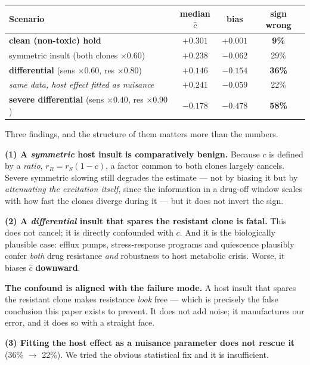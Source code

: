 \documentclass[11pt,a4paper]{article}
\newcommand{\chat}{\hat{c}}
\begin{document}
\begin{center}
\small
\begin{tabular}{lccc}
\toprule
\textbf{Scenario} & \textbf{median $\chat$} & \textbf{bias} & \textbf{sign wrong}\\
\midrule
\textbf{clean (non-toxic) hold} & $+0.301$ & $+0.001$ & \textbf{9\%}\\
symmetric insult (both clones $\times 0.60$) & $+0.238$ & $-0.062$ & 29\%\\
\textbf{differential} (sens $\times0.60$, res $\times0.80$) & $+0.146$ & $-0.154$ & \textbf{36\%}\\
\quad \emph{same data, host effect fitted as nuisance} & $+0.241$ & $-0.059$ & 22\%\\
\textbf{severe differential} (sens $\times0.40$, res $\times0.90$) & $\mathbf{-0.178}$ & $\mathbf{-0.478}$ & \textbf{58\%}\\
\bottomrule
\end{tabular}
\end{center}

Three findings, and the structure of them matters more than the numbers.

\textbf{(1) A \emph{symmetric} host insult is comparatively benign.} Because $c$ is
defined by a \emph{ratio}, $r_R = r_S(1-c)$, a factor common to both clones largely
cancels. Severe symmetric slowing still degrades the estimate --- not by biasing it
but by \emph{attenuating the excitation itself}, since the information in a drug-off
window scales with how fast the clones diverge during it --- but it does not invert
the sign.

\textbf{(2) A \emph{differential} insult that spares the resistant clone is fatal.}
This does not cancel; it is directly confounded with $c$. And it is the biologically
plausible case: efflux pumps, stress-response programs and quiescence plausibly
confer \emph{both} drug resistance \emph{and} robustness to host metabolic crisis.
Worse, it biases $\chat$ \textbf{downward}.

\begin{tcolorbox}[keybox]
\textbf{The confound is aligned with the failure mode.} A host insult that spares the
resistant clone makes resistance \emph{look} free --- which is precisely the false
conclusion this paper exists to prevent. It does not add noise; it manufactures our
error, and it does so with a straight face.
\end{tcolorbox}

\textbf{(3) Fitting the host effect as a nuisance parameter does not rescue it}
(36\% $\to$ 22\%). We tried the obvious statistical fix and it is insufficient.
\end{document}
